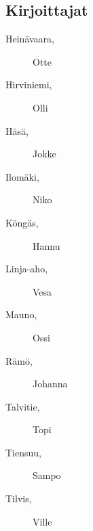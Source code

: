 \subsection*{Kirjoittajat}
\begin{description}
\item[Heinävaara, ] Otte
\item[Hirviniemi, ] Olli
\item[Häsä, ] Jokke
\item[Ilomäki, ] Niko
\item[Köngäs, ] Hannu
\item[Linja-aho, ] Vesa
\item[Mauno, ] Ossi
\item[Rämö, ] Johanna
\item[Talvitie, ] Topi
\item[Tiensuu, ] Sampo
\item[Tilvis, ] Ville
\end{description}

